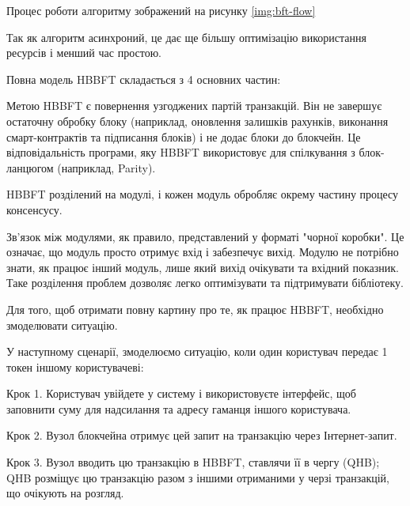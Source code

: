 \documentclass{lib/styles/default-style}
\begin{document}
    Процес роботи алгоритму зображений на рисунку \ref{img:bft-flow}


    Так як алгоритм асинхроний, це дає ще більшу оптимізацію використання ресурсів і менший час простою.

    Повна модель HBBFT складається з 4 основних частин:

    

    Метою HBBFT є повернення узгоджених партій транзакцій.
    Він не завершує остаточну обробку блоку (наприклад, оновлення залишків рахунків, виконання смарт-контрактів та підписання блоків)
    і не додає блоки до блокчейн. Це відповідальність програми, яку HBBFT використовує для спілкування з блок-ланцюгом (наприклад, Parity).

    HBBFT розділений на модулі, і кожен модуль обробляє окрему частину процесу консенсусу.

    Зв'язок між модулями, як правило, представлений у форматі "чорної коробки".
    Це означає, що модуль просто отримує вхід і забезпечує вихід.
    Модулю не потрібно знати, як працює інший модуль, лише який вихід очікувати та вхідний показник.
    Таке розділення проблем дозволяє легко оптимізувати та підтримувати бібліотеку.

    Для того, щоб отримати повну картину про те, як працює HBBFT, необхідно змоделювати ситуацію.

    У наступному сценарії, змоделюємо ситуацію, коли один користувач передає 1 токен іншому користувачеві:
    
    Крок 1. Користувач увійдете у систему і використовуєте інтерфейс,
    щоб заповнити суму для надсилання та адресу гаманця іншого користувача.

    Крок 2. Вузол блокчейна отримує цей запит на транзакцію через Інтернет-запит.
    
    Крок 3. Вузол вводить цю транзакцію в HBBFT, ставлячи її в чергу (QHB);
    QHB розміщує цю транзакцію разом з іншими отриманими у черзі транзакцій,
        що очікують на розгляд.
    
\end{document}
